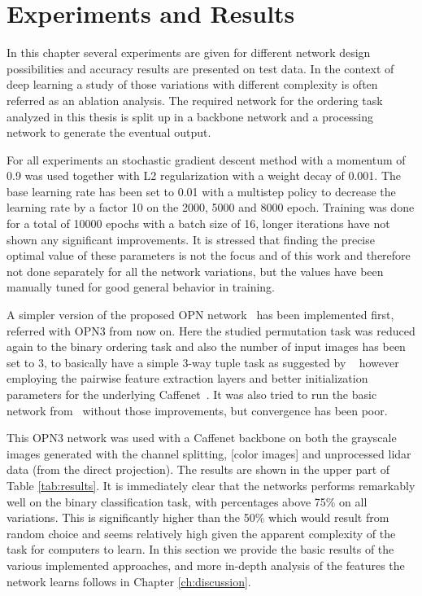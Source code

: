 %
\newpage
\chapter{Experiments and Results}
\label{ch:experimentsandresults}
In this chapter several experiments are given for different network design possibilities and accuracy results are presented on test data. In the context of deep learning a study of those variations with different complexity is often referred as an ablation analysis. The required network for the ordering task analyzed in this thesis is split up in a backbone network and a processing network to generate the eventual output. 

For all experiments an stochastic gradient descent method with a momentum of 0.9 was used together with L2 regularization with a weight decay of 0.001. The base learning rate has been set to 0.01 with a multistep policy to decrease the learning rate by a factor 10 on the 2000, 5000 and 8000 epoch. Training was done for a total of 10000 epochs with a batch size of 16, longer iterations have not shown any significant improvements. It is stressed that finding the precise optimal value of these parameters is not the focus and of this work and therefore not done separately for all the network variations, but the values have been manually tuned for good general behavior in training. 

A simpler version of the proposed OPN network~\cite{lee2017} has been implemented first, referred with OPN3 from now on. Here the studied permutation task was reduced again to the binary ordering task and also the number of input images has been set to 3, to basically have a simple 3-way tuple task as suggested by ~\cite{misra2016} however employing the pairwise feature extraction layers and better initialization parameters for the underlying Caffenet~\cite{jia2014}. It was also tried to run the basic network from~\cite{misra2016} without those improvements, but convergence has been poor. 

This OPN3 network was used with a Caffenet backbone on both the grayscale images generated with the channel splitting, [color images] and unprocessed lidar data (from the direct projection). The results are shown in the upper part of Table \ref{tab:results}. It is immediately clear that the networks performs remarkably well on the binary classification task, with percentages above 75\% on all variations. This is significantly higher than the 50\% which would result from random choice and seems relatively high given the apparent complexity of the task for computers to learn. In this section we provide the basic results of the various implemented approaches, and more in-depth analysis of the features the network learns follows in Chapter \ref{ch:discussion}.

